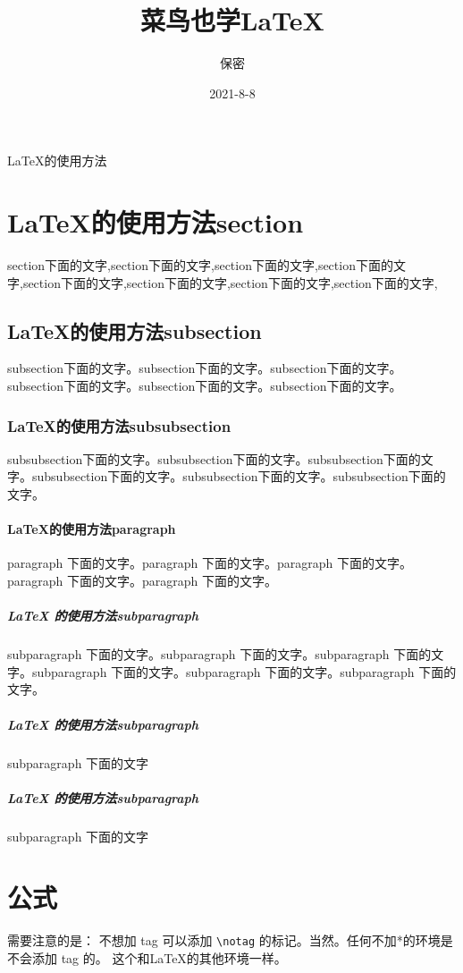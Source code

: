 \documentclass[utf-8,a4paper,11pt]{article}
\title{菜鸟也学\LaTeX}
\author{保密}
\date{2021-8-8}
\begin{document}
\maketitle


\LaTeX 的使用方法

\section{LaTeX的使用方法section}
section下面的文字,section下面的文字,section下面的文字,section下面的文字,section下面的文字,section下面的文字,section下面的文字,section下面的文字,

\subsection{LaTeX的使用方法subsection}
subsection下面的文字。subsection下面的文字。subsection下面的文字。subsection下面的文字。subsection下面的文字。subsection下面的文字。

\subsubsection{LaTeX的使用方法subsubsection}
subsubsection下面的文字。subsubsection下面的文字。subsubsection下面的文字。subsubsection下面的文字。subsubsection下面的文字。subsubsection下面的文字。

\paragraph{\LaTeX{}的使用方法paragraph}
paragraph 下面的文字。paragraph 下面的文字。paragraph 下面的文字。paragraph 下面的文字。paragraph 下面的文字。

\subparagraph{\LaTeX{} 的使用方法subparagraph}
subparagraph 下面的文字。subparagraph 下面的文字。subparagraph 下面的文字。subparagraph 下面的文字。subparagraph 下面的文字。subparagraph 下面的文字。

\subparagraph{\LaTeX{} 的使用方法subparagraph}
subparagraph 下面的文字

\subparagraph{\LaTeX{} 的使用方法subparagraph}
subparagraph 下面的文字

\section{公式}

需要注意的是： 不想加 tag 可以添加 \verb!\notag! 的标记。当然。任何不加*的环境是不会添加 tag 的。 这个和\LaTeX 的其他环境一样。
\end{document}
